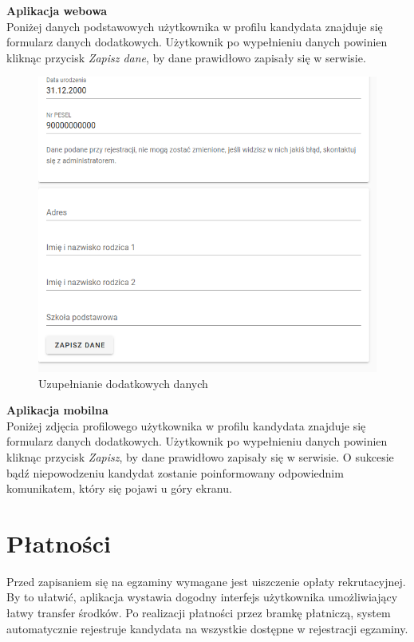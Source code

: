 \documentclass{article}
\begin{document}
\textbf{Aplikacja webowa} \\
Poniżej danych podstawowych użytkownika w profilu kandydata znajduje się formularz danych dodatkowych. Użytkownik po wypełnieniu danych powinien kliknąc przycisk \emph{Zapisz dane}, by dane prawidłowo zapisały się w serwisie.
\begin{figure}[H]
    \centering
    \includegraphics[width=1\linewidth]{images/web/additional_data.png}
    \caption{Uzupełnianie dodatkowych danych}
    \label{fig:test3_label}
\end{figure}

\textbf{Aplikacja mobilna} \\
Poniżej zdjęcia profilowego użytkownika w profilu kandydata znajduje się formularz danych dodatkowych. Użytkownik po wypełnieniu danych powinien kliknąc przycisk \emph{Zapisz}, by dane prawidłowo zapisały się w serwisie. O sukcesie bądź niepowodzeniu kandydat zostanie poinformowany odpowiednim komunikatem, który się pojawi u góry ekranu.

\section{Płatności}
Przed zapisaniem się na egzaminy wymagane jest uiszczenie opłaty rekrutacyjnej. By to ułatwić, aplikacja wystawia dogodny interfejs użytkownika umożliwiający łatwy transfer środków. Po realizacji płatności przez bramkę płatniczą, system automatycznie rejestruje kandydata na wszystkie dostępne w rejestracji egzaminy.
\end{document}
